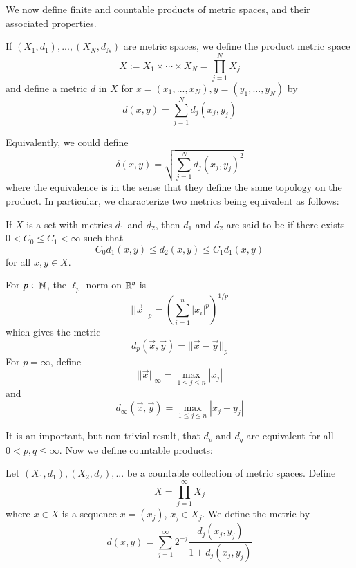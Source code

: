 We now define finite and countable products of metric spaces, and their associated properties.

\begin{definition}
    If $(X_1,d_1),...,(X_N,d_N)$ are metric spaces, we define the product metric space \begin{equation*}
        X := X_1\times \cdots \times X_N = \prod_{j=1}^NX_j
    \end{equation*}
    and define a metric $d$ in $X$ for $x = (x_1,...,x_N),y = (y_1,...,y_N)$ by \begin{equation*}
        d(x,y) = \sum_{j=1}^Nd_j(x_j,y_j)
    \end{equation*}
\end{definition}
Equivalently, we could define \begin{equation*}
    \delta(x,y) = \sqrt{\sum_{j=1}^Nd_j(x_j,y_j)^2}
\end{equation*}
where the equivalence is in the sense that they define the same topology on the product. In particular, we characterize two metrics being equivalent as follows:

\begin{definition}
    If $X$ is a set with metrics $d_1$ and $d_2$, then $d_1$ and $d_2$ are said to be  if there exists $0 < C_0 \leq C_1 < \infty$ such that \begin{equation*}
        C_0d_1(x,y) \leq d_2(x,y) \leq C_1d_1(x,y)
    \end{equation*}
    for all $x,y \in X$.
\end{definition}

\begin{definition}
    For $p \in \mathbb N$, the $\ell_p$ norm on $\mathbb R^n$ is \begin{equation*}
        ||\vec{x}||_p = \left(\sum_{i=1}^n|x_i|^p\right)^{1/p}
    \end{equation*}
    which gives the metric $$d_p(\vec{x},\vec{y}) = ||\vec{x} - \vec{y}||_p$$ For $p = \infty$, define $$||\vec{x}||_{\infty} = \max_{1\leq j \leq n}|x_j|$$ and $$d_{\infty}(\vec{x},\vec{y}) = \max_{1\leq j \leq n}|x_j - y_j|$$
\end{definition}

It is an important, but non-trivial result, that $d_p$ and $d_q$ are equivalent for all $0 < p,q \leq \infty$. Now we define countable products:

\begin{definition}
    Let $(X_1,d_1),(X_2,d_2),...$ be a countable collection of metric spaces. Define $$X = \prod_{j=1}^{\infty}X_j$$ where $x \in X$ is a sequence $x = (x_j)$, $x_j \in X_j$. We define the metric by $$d(x,y) = \sum_{j=1}^{\infty}2^{-j}\frac{d_j(x_j,y_j)}{1+d_j(x_j,y_j)}$$
\end{definition}

